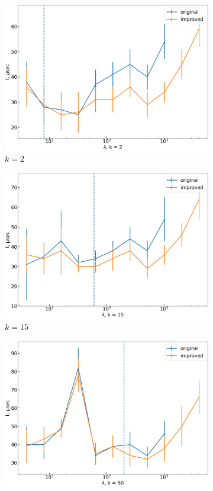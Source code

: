 \documentclass[final,5p,twocolumn,preprint,nopreprintline,times,authoryear]{elsarticle}
\begin{document}
\begin{figure}[h]
	\centering
	\begin{subfigure}[t]{0.35\textwidth}
		\centering
		\includegraphics[width=\linewidth]{boost_k_fixed_2.png}
		\caption{$k=2$}
	\end{subfigure}
	\;
	\begin{subfigure}[t]{0.35\textwidth}
		\centering
		\includegraphics[width=\linewidth]{boost_k_fixed_15.png}
		\caption{$k=15$}
	\end{subfigure}
	\;
	\begin{subfigure}[t]{0.35\textwidth}
		\centering
		\includegraphics[width=\linewidth]{boost_k_fixed_50.png}

\end{subfigure}
\end{figure}
\end{document}
